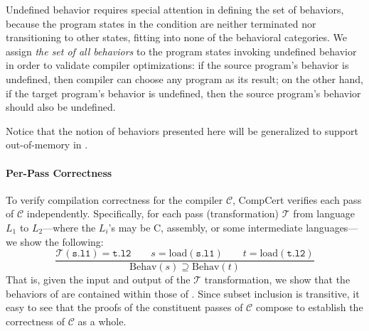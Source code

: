Undefined behavior requires special attention in defining the set of behaviors, because the program
states in the condition are neither terminated nor transitioning to other states, fitting into none
of the behavioral categories.  We assign \emph{the set of all behaviors} to the program states
invoking undefined behavior in order to validate compiler optimizations: if the source program's
behavior is undefined, then compiler can choose any program as its result; on the other hand, if the
target program's behavior is undefined, then the source program's behavior should also be undefined.

Notice that the notion of behaviors presented here will be generalized to support out-of-memory in
.


\paragraph{Per-Pass Correctness}

To verify compilation correctness for the compiler $\mathcal{C}$, CompCert verifies each pass of
$\mathcal{C}$ independently.  Specifically, for each pass (transformation) $\mathcal{T}$ from
language $L_1$ to $L_2$---where the $L_i$'s may be C, assembly, or some intermediate languages---we
show the following:
\[
\frac{
\mathcal{T}(\mathtt{s.l1}) = \mathtt{t.l2} \qquad
s = \mathrm{load}(\mathtt{s.l1}) \qquad
t = \mathrm{load}(\mathtt{t.l2})
}
{
\mathrm{Behav}(s) \supseteq \mathrm{Behav}(t)
}
\]
That is, given the input  and output  of the $\mathcal{T}$ transformation, we
show that the behaviors of  are contained within those of .  Since subset
inclusion is transitive, it easy to see that the proofs of the constituent passes of $\mathcal{C}$
compose to establish the correctness of $\mathcal{C}$ as a whole.




